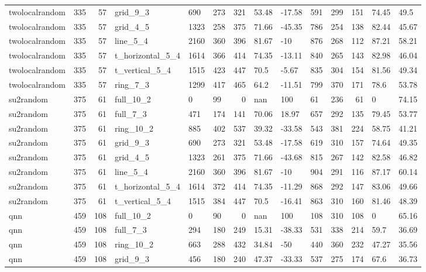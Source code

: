 \begin{longtable}{lrrlllrllllrll}
twolocalrandom & 335 & 57 & grid\_9\_3 & 690 & 273 & 321 & 53.48 & -17.58 & 591 & 299 & 151 & 74.45 & 49.5 \\
twolocalrandom & 335 & 57 & grid\_4\_5 & 1323 & 258 & 375 & 71.66 & -45.35 & 786 & 254 & 138 & 82.44 & 45.67 \\
twolocalrandom & 335 & 57 & line\_5\_4 & 2160 & 360 & 396 & 81.67 & -10 & 876 & 268 & 112 & 87.21 & 58.21 \\
twolocalrandom & 335 & 57 & t\_horizontal\_5\_4 & 1614 & 366 & 414 & 74.35 & -13.11 & 840 & 265 & 143 & 82.98 & 46.04 \\
twolocalrandom & 335 & 57 & t\_vertical\_5\_4 & 1515 & 423 & 447 & 70.5 & -5.67 & 835 & 304 & 154 & 81.56 & 49.34 \\
twolocalrandom & 335 & 57 & ring\_7\_3 & 1299 & 417 & 465 & 64.2 & -11.51 & 799 & 370 & 171 & 78.6 & 53.78 \\
su2random & 375 & 61 & full\_10\_2 & 0 & 99 & 0 & nan & 100 & 61 & 236 & 61 & 0 & 74.15 \\
su2random & 375 & 61 & full\_7\_3 & 471 & 174 & 141 & 70.06 & 18.97 & 657 & 292 & 135 & 79.45 & 53.77 \\
su2random & 375 & 61 & ring\_10\_2 & 885 & 402 & 537 & 39.32 & -33.58 & 543 & 381 & 224 & 58.75 & 41.21 \\
su2random & 375 & 61 & grid\_9\_3 & 690 & 273 & 321 & 53.48 & -17.58 & 619 & 310 & 157 & 74.64 & 49.35 \\
su2random & 375 & 61 & grid\_4\_5 & 1323 & 261 & 375 & 71.66 & -43.68 & 815 & 267 & 142 & 82.58 & 46.82 \\
su2random & 375 & 61 & line\_5\_4 & 2160 & 360 & 396 & 81.67 & -10 & 904 & 291 & 116 & 87.17 & 60.14 \\
su2random & 375 & 61 & t\_horizontal\_5\_4 & 1614 & 372 & 414 & 74.35 & -11.29 & 868 & 292 & 147 & 83.06 & 49.66 \\
su2random & 375 & 61 & t\_vertical\_5\_4 & 1515 & 384 & 447 & 70.5 & -16.41 & 863 & 310 & 160 & 81.46 & 48.39 \\
qnn & 459 & 108 & full\_10\_2 & 0 & 90 & 0 & nan & 100 & 108 & 310 & 108 & 0 & 65.16 \\
qnn & 459 & 108 & full\_7\_3 & 294 & 180 & 249 & 15.31 & -38.33 & 531 & 338 & 214 & 59.7 & 36.69 \\
qnn & 459 & 108 & ring\_10\_2 & 663 & 288 & 432 & 34.84 & -50 & 440 & 360 & 232 & 47.27 & 35.56 \\
qnn & 459 & 108 & grid\_9\_3 & 456 & 180 & 240 & 47.37 & -33.33 & 537 & 275 & 174 & 67.6 & 36.73 \\

\end{longtable}
